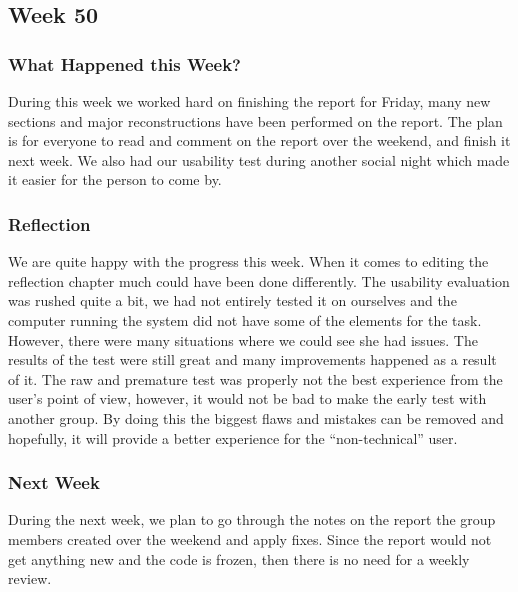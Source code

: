 \subsection{Week 50}
\subsubsection{What Happened this Week?}
During this week we worked hard on finishing the report for Friday, many new
sections and major reconstructions have been performed on the report. The plan
is for everyone to read and comment on the report over the weekend, and finish
it next week. We also had our usability test during another social night which
made it easier for the person to come by.

\subsubsection{Reflection}
We are quite happy with the progress this week. When it comes to editing
the reflection chapter much could have been done differently. The
usability evaluation was rushed quite a bit, we had not entirely tested it on
ourselves and the computer running the system did not have some of the elements
for the task.
However, there were many situations where we could see she had issues. The
results of the test were still great and many improvements happened as a result
of it. The raw and premature test was properly not the best experience from the
user's point of view, however, it would not be bad to make the early test with
another group.
By doing this the biggest flaws and mistakes can be removed and
hopefully, it will provide a better experience for the ``non-technical'' user.

\subsubsection{Next Week}
During the next week, we plan to go through the notes on the report the group
members created over the weekend and apply fixes. Since the report would not get
anything new and the code is frozen, then there is no need for a weekly review.
